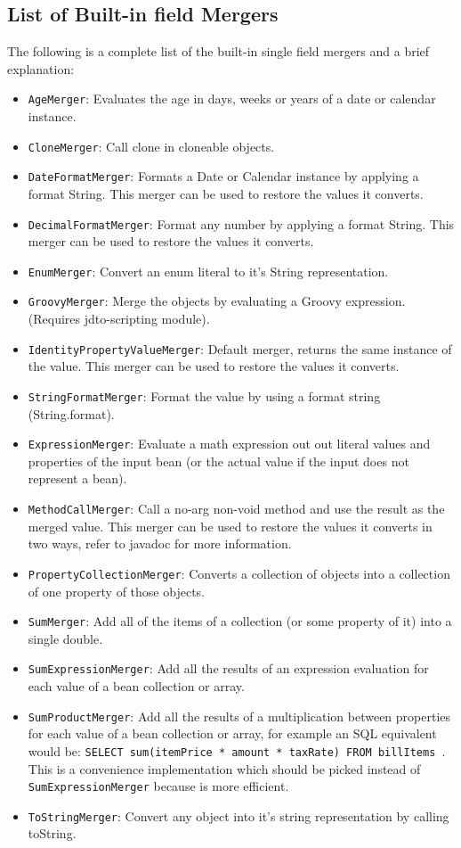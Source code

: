\documentclass[11pt]{article}
\begin{document}
\subsection{List of Built-in field Mergers}


The following is a complete list of the built-in single field mergers and a brief explanation:

\begin{itemize}
 \item \texttt{AgeMerger}: Evaluates the age in days, weeks or years of a date or calendar instance.
 \item \texttt{CloneMerger}: Call clone in cloneable objects.
 \item \texttt{DateFormatMerger}: Formats a Date or Calendar instance by applying a format String. This merger can be used to restore the values it converts.
 \item \texttt{DecimalFormatMerger}: Format any number by applying a format String. This merger can be used to restore the values it converts.
 \item \texttt{EnumMerger}: Convert an enum literal to it's String representation.
 \item \texttt{GroovyMerger}: Merge the objects by evaluating a Groovy expression. (Requires jdto-scripting module).
 \item \texttt{IdentityPropertyValueMerger}: Default merger, returns the same instance of the value. This merger can be used to restore the values it converts.
 \item \texttt{StringFormatMerger}: Format the value by using a format string (String.format).
 \item \texttt{ExpressionMerger}: Evaluate a math expression out out literal values and properties of the input bean (or the actual value if the input does not represent a bean).
 \item \texttt{MethodCallMerger}: Call a no-arg non-void method and use the result as the merged value. This merger can be used to restore the values it converts in two ways, refer to javadoc for more information.
 \item \texttt{PropertyCollectionMerger}: Converts a collection of objects into a collection of one property of those objects.
 \item \texttt{SumMerger}: Add all of the items of a collection (or some property of it) into a single double.
 \item \texttt{SumExpressionMerger}: Add all the results of an expression evaluation for each value of a bean collection or array.
 \item \texttt{SumProductMerger}: Add all the results of a multiplication between properties for each value of a bean collection or array, for example an SQL equivalent would be: \texttt{SELECT sum(itemPrice * amount * taxRate) FROM billItems }. This is a convenience implementation which should be picked instead of \texttt{SumExpressionMerger} because is more efficient.
 \item \texttt{ToStringMerger}: Convert any object into it's string representation by calling toString.
\end{itemize}
\end{document}
